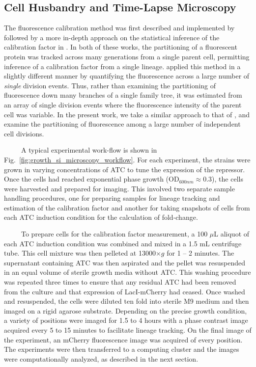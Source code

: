 \documentclass[12pt]{caltech_thesis}
\begin{document}
\hypertarget{cell-husbandry-and-time-lapse-microscopy}{%
\subsection{Cell Husbandry and Time-Lapse
Microscopy}\label{cell-husbandry-and-time-lapse-microscopy}}

The fluorescence calibration method was first described and implemented
by \textcite{rosenfeld2005} followed by a more in-depth approach on the
statistical inference of the calibration factor in
\textcite{rosenfeld2006}. In both of these works, the partitioning of a
fluorescent protein was tracked across many generations from a single
parent cell, permitting inference of a calibration factor from a single
lineage. \textcite{brewster2014} applied this method in a slightly
different manner by quantifying the fluorescence across a large number
of \emph{single} division events. Thus, rather than examining the
partitioning of fluorescence down many branches of a single family tree,
it was estimated from an array of single division events where the
fluorescence intensity of the parent cell was variable. In the present
work, we take a similar approach to that of \textcite{brewster2014}, and
examine the partitioning of fluorescence among a large number of
independent cell divisions.

~~~~~A typical experimental work-flow is shown in
Fig.~\ref{fig:growth_si_microscopy_workflow}. For each experiment, the
strains were grown in varying concentrations of ATC to tune the
expression of the repressor. Once the cells had reached exponential
phase growth (OD\(_{600nm} \approx 0.3\)), the cells were harvested and
prepared for imaging. This involved two separate sample handling
procedures, one for preparing samples for lineage tracking and
estimation of the calibration factor and another for taking snapshots of
cells from each ATC induction condition for the calculation of
fold-change.

~~~~~To prepare cells for the calibration factor measurement, a 100
\(\mu\)L aliquot of each ATC induction condition was combined and mixed
in a 1.5 mL centrifuge tube. This cell mixture was then pelleted at
13000\(\times g\) for 1 -- 2 minutes. The supernatant containing ATC was
then aspirated and the pellet was resuspended in an equal volume of
sterile growth media without ATC. This washing procedure was repeated
three times to ensure that any residual ATC had been removed from the
culture and that expression of LacI-mCherry had ceased. Once washed and
resuspended, the cells were diluted ten fold into sterile M9 medium and
then imaged on a rigid agarose substrate. Depending on the precise
growth condition, a variety of positions were imaged for 1.5 to 4 hours
with a phase contrast image acquired every 5 to 15 minutes to facilitate
lineage tracking. On the final image of the experiment, an mCherry
fluorescence image was acquired of every position. The experiments were
then transferred to a computing cluster and the images were
computationally analyzed, as described in the next section.
\end{document}
